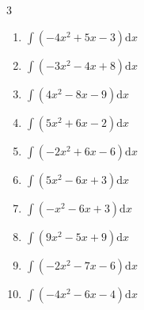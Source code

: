 \begin{multicols}{3}
\begin{enumerate}
  \item $\displaystyle \int \left( -4x^{2}+5x-3 \right) \mathrm{d}x$


\columnbreak %

\resetques

  \item $\displaystyle \int \left( -3x^{2}-4x+8 \right) \mathrm{d}x$


  \item $\displaystyle \int \left( 4x^{2}-8x-9 \right) \mathrm{d}x$


  \item $\displaystyle \int \left( 5x^{2}+6x-2 \right) \mathrm{d}x$


  \item $\displaystyle \int \left( -2x^{2}+6x-6 \right) \mathrm{d}x$


  \item $\displaystyle \int \left( 5x^{2}-6x+3 \right) \mathrm{d}x$


  \item $\displaystyle \int \left( -x^{2}-6x+3 \right) \mathrm{d}x$


  \item $\displaystyle \int \left( 9x^{2}-5x+9 \right) \mathrm{d}x$


  \item $\displaystyle \int \left( -2x^{2}-7x-6 \right) \mathrm{d}x$


  \item $\displaystyle \int \left( -4x^{2}-6x-4 \right) \mathrm{d}x$



\end{enumerate}
\end{multicols}
